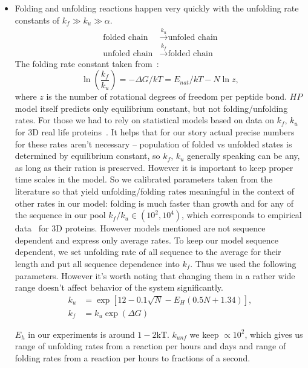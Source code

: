 \documentclass[journal=jacsat,manuscript=article,layout=twocolumn]{achemso}
\newcommand*{\ga}{\alpha}
\newcommand*{\gD}{\Delta}
\newcommand*{\pt}[1]{\left( #1\right)}
\begin{document}
\begin{itemize}
\item Folding and unfolding reactions happen very quickly with 
the unfolding rate constants of $k_f\gg k_{u}\gg\ga$. 
\begin{equation}
\begin{split}
 \mbox{folded chain}&\xrightarrow{k_u}\mbox{unfoled chain}  \\
 \mbox{unfoled chain}&\xrightarrow{k_f}\mbox{folded chain}
\end{split}
\end{equation}
The folding rate constant taken 
from~\cite{Ghosh2009}:
\begin{equation}
 \ln\pt{\frac{k_f}{k_u}}=-\gD G/kT = E_{nat}/kT-N\ln z,
\end{equation} 
 where $z$ is the number of rotational degrees of freedom per peptide bond.
 $HP$ model itself predicts only equilibrium constant, but not folding/unfolding rates.
 For those we had to rely on statistical models based on data on $k_f,\,k_u$ for 3D real life 
proteins~\cite{Ghosh2010,Dill2011}.
It helps that for our story actual precise numbers for these rates aren't necessary -- population 
of folded vs unfolded states is determined by equilibrium constant, so $k_f,\,k_u$ generally 
speaking can be any, as long as their ration is preserved. However it is important to keep proper 
time scales in the model. So we calibrated parameters taken from the literature so that yield 
unfolding/folding rates meaningful in the context of other rates in our model: folding is much 
faster than growth and for any of the sequence in our pool $k_f/k_u\in (10^2,10^4)$, which 
corresponds to empirical data~\cite{Ghosh2010,Dill2011} for 3D proteins.
However models mentioned are not sequence dependent and express only average rates. To keep our 
model sequence dependent, we set unfolding rate of all sequence to the average for their length 
and put all sequence dependence into $k_f$. Thus we used the following parameters. However it's 
worth noting that changing them in a rather wide range doesn't affect behavior of the system 
significantly.
\begin{equation}
\begin{split}
  k_u &= \exp[12-0.1 \sqrt{N} -E_H(0.5 N + 1.34)],\\
  k_f &= k_u\exp(\gD G)
\end{split}
\end{equation}

$E_h$ in our experiments is around $1-2$kT. $k_{unf}$ we keep $\propto 10^2$, which 
gives us range of unfolding rates from a reaction per hours and days and range of folding rates 
from a reaction per hours to fractions of a second.


\end{itemize}
\end{document}
